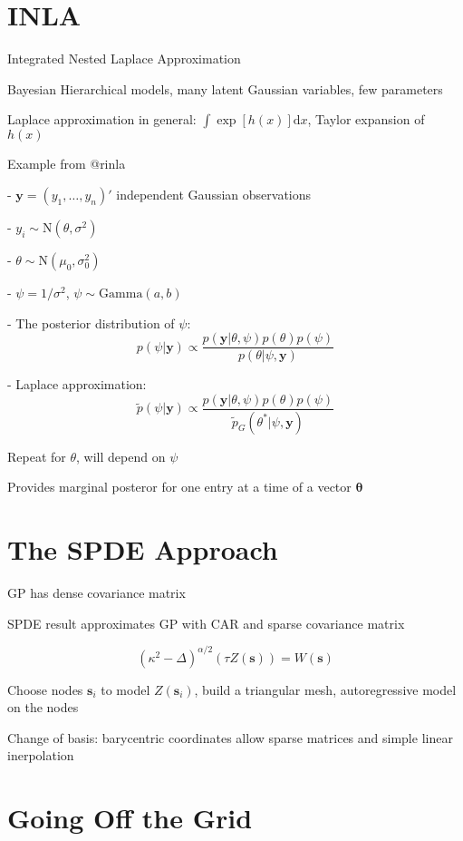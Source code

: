 \documentclass[]{interact}
\begin{document}
\section{INLA}

Integrated Nested Laplace Approximation

Bayesian Hierarchical models, many latent Gaussian variables, few parameters

Laplace approximation in general: $\int \exp[h(x)]\mathrm{d}x$, Taylor expansion of $h(x)$

Example from @rinla

- $\mathbf{y} = (y_{1}, \dots, y_{n})'$ independent Gaussian observations

- $y_{i} \sim \mathrm{N}(\theta, \sigma^{2})$

- $\theta \sim \mathrm{N}(\mu_{0}, \sigma_{0}^{2})$

- $\psi = 1/\sigma^{2}$, $\psi \sim \mathrm{Gamma}(a, b)$

- The posterior distribution of $\psi$:
$$p(\psi|\mathbf{y}) \propto \frac{p(\mathbf{y} | \theta, \psi) p(\theta) p(\psi)}
{p(\theta | \psi, \mathbf{y})}$$

- Laplace approximation:
$$\tilde{p}(\psi|\mathbf{y}) \propto \frac{p(\mathbf{y} | \theta, \psi) p(\theta) p(\psi)}
{\tilde{p}_{G}(\theta^{*} | \psi, \mathbf{y})}$$

Repeat for $\theta$, will depend on $\psi$

Provides marginal posteror for one entry at a time of a vector $\boldsymbol{\theta}$


\section{The SPDE Approach}

GP has dense covariance matrix

SPDE result approximates GP with CAR and sparse covariance matrix \cite{lindgrenetal}

$$(\kappa^{2} - \Delta)^{\alpha / 2} (\tau Z(\mathbf{s})) = W(\mathbf{s})$$

Choose nodes $\mathbf{s}_{i}$ to model $Z(\mathbf{s}_{i})$, build a triangular mesh, autoregressive model on the nodes

Change of basis: barycentric coordinates allow sparse matrices and simple linear inerpolation


\section{Going Off the Grid}
\end{document}
